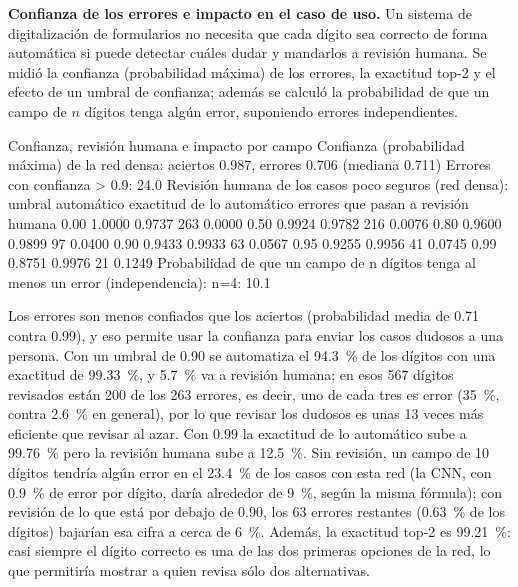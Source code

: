 \documentclass[11pt,letterpaper]{article}
\begin{document}
\textbf{Confianza de los errores e impacto en el caso de uso.} Un sistema de digitalización de formularios no necesita que cada dígito sea correcto de forma automática si puede detectar cuáles dudar y mandarlos a revisión humana. Se midió la confianza (probabilidad máxima) de los errores, la exactitud top-2 y el efecto de un umbral de confianza; además se calculó la probabilidad de que un campo de $n$ dígitos tenga algún error, suponiendo errores independientes.

\begin{consola}[label=out:confianza]{Confianza, revisión humana e impacto por campo}
Confianza (probabilidad máxima) de la red densa: aciertos 0.987, errores 0.706 (mediana 0.711)
Errores con confianza > 0.9: 24.0%
Revisión humana de los casos poco seguros (red densa):
 umbral  automático  exactitud de lo automático  errores que pasan  a revisión humana
   0.00      1.0000                      0.9737                263             0.0000
   0.50      0.9924                      0.9782                216             0.0076
   0.80      0.9600                      0.9899                 97             0.0400
   0.90      0.9433                      0.9933                 63             0.0567
   0.95      0.9255                      0.9956                 41             0.0745
   0.99      0.8751                      0.9976                 21             0.1249
Probabilidad de que un campo de n dígitos tenga al menos un error (independencia):
  n=4: 10.1%
\end{consola}

Los errores son menos confiados que los aciertos (probabilidad media de 0.71 contra 0.99), y eso permite usar la confianza para enviar los casos dudosos a una persona. Con un umbral de 0.90 se automatiza el 94.3~\% de los dígitos con una exactitud de 99.33~\%, y 5.7~\% va a revisión humana; en esos 567 dígitos revisados están 200 de los 263 errores, es decir, uno de cada tres es error (35~\%, contra 2.6~\% en general), por lo que revisar los dudosos es unas 13 veces más eficiente que revisar al azar. Con 0.99 la exactitud de lo automático sube a 99.76~\% pero la revisión humana sube a 12.5~\%. Sin revisión, un campo de 10 dígitos tendría algún error en el 23.4~\% de los casos con esta red (la CNN, con 0.9~\% de error por dígito, daría alrededor de 9~\%, según la misma fórmula); con revisión de lo que está por debajo de 0.90, los 63 errores restantes (0.63~\% de los dígitos) bajarían esa cifra a cerca de 6~\%. Además, la exactitud top-2 es 99.21~\%: casi siempre el dígito correcto es una de las dos primeras opciones de la red, lo que permitiría mostrar a quien revisa sólo dos alternativas.
\end{document}
